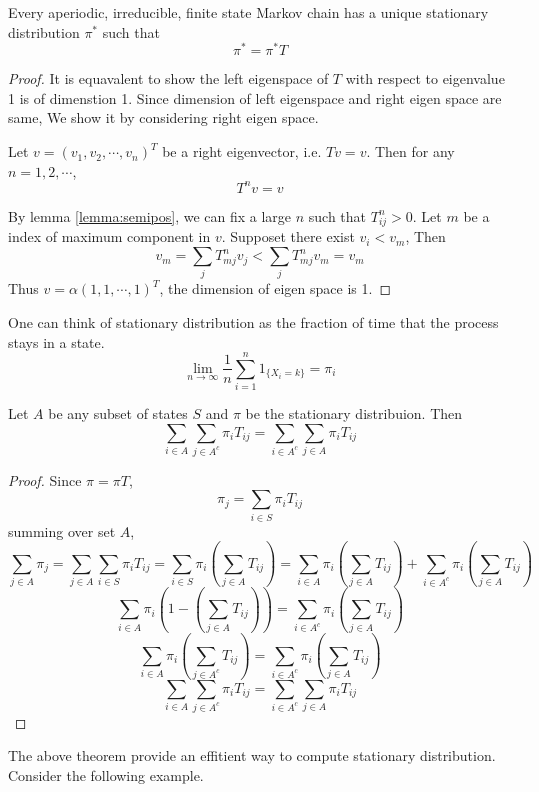 \begin{theorem}
	Every aperiodic, irreducible, finite state Markov chain has a unique stationary distribution $\pi^*$ such that
	$$\pi^* = \pi^* T$$
\end{theorem}
\begin{proof}
	It is equavalent to show the left eigenspace of $T$ with respect to eigenvalue 1 is of dimenstion 1. Since dimension of left eigenspace and right eigen space are same, We show it by considering right eigen space. 
	
	Let $v=(v_1,v_2,\cdots,v_n)^T$ be a right eigenvector, i.e. $Tv=v$. Then for any $n=1,2,\cdots$,
	$$T^n v = v$$
	
	By lemma \ref{lemma:semipos}, we can fix a large $n$ such that $T^n_{ij}>0$. Let $m$ be a index of maximum component in $v$. Supposet there exist $v_i<v_m$, Then
	$$v_m = \sum_j T^n_{mj}v_j < \sum_j T^n_{mj}v_m = v_m $$
	Thus $v=\alpha(1,1,\cdots,1)^T$, the dimension of eigen space is 1.
\end{proof}

One can think of stationary distribution as the fraction of time that the process stays in a state.
$$\lim_{n\to \infty} \frac{1}{n} \sum_{i=1}^{n} 1_{\{X_i = k\}} = \pi_i$$
\begin{theorem} \label{thm:flux}
	Let $A$ be any subset of states $S$ and $\pi$ be the stationary distribuion. Then
	$$\sum_{i\in A}\sum_{j\in A^c} \pi_i T_{ij} = \sum_{i\in A^c} \sum_{j\in A} \pi_i T_{ij}$$
\end{theorem}
\begin{proof}
	Since $\pi = \pi T$,
	$$\pi_j = \sum_{i\in S} \pi_i T_{ij}$$
	summing over set $A$,
	$$\sum_{j\in A} \pi_j = \sum_{j\in A} \sum_{i\in S} \pi_i T_{ij} =  \sum_{i\in S} \pi_i \left( \sum_{j\in A} T_{ij} \right)=  \sum_{i\in A} \pi_i \left( \sum_{j\in A} T_{ij} \right)+\sum_{i\in A^c} \pi_i \left( \sum_{j\in A} T_{ij} \right)$$
	$$\sum_{i\in A} \pi_i \left(1 - \left( \sum_{j\in A} T_{ij} \right) \right) =  \sum_{i\in A^c} \pi_i \left( \sum_{j\in A} T_{ij} \right)$$
	$$\sum_{i\in A} \pi_i \left( \sum_{j\in A^c} T_{ij} \right)=  \sum_{i\in A^c} \pi_i \left( \sum_{j\in A} T_{ij} \right)$$
	$$\sum_{i\in A}\sum_{j\in A^c} \pi_i T_{ij}=  \sum_{i\in A^c} \sum_{j\in A} \pi_i T_{ij}$$
\end{proof}

The above theorem provide an effitient way to compute stationary distribution. Consider the following example.

